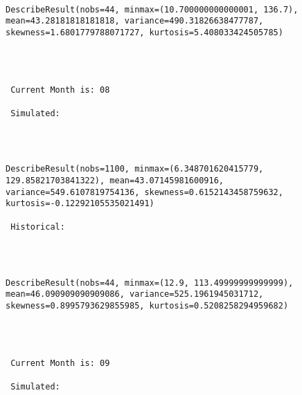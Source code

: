 \documentclass[11pt]{article}
\begin{document}
    \begin{center}
    \end{center}
    { \hspace*{\fill} \\}
    
    \begin{Verbatim}[commandchars=\\\{\}]
DescribeResult(nobs=44, minmax=(10.700000000000001, 136.7), mean=43.28181818181818, variance=490.31826638477787, skewness=1.6801779788071727, kurtosis=5.408033424505785) 



 
 Current Month is: 08

 Simulated: 
 

    \end{Verbatim}

    \begin{center}
    \end{center}
    { \hspace*{\fill} \\}
    
    \begin{Verbatim}[commandchars=\\\{\}]
DescribeResult(nobs=1100, minmax=(6.348701620415779, 129.85821703841322), mean=43.07145981600916, variance=549.6107819754136, skewness=0.6152143458759632, kurtosis=-0.12292105535021491)

 Historical: 
 

    \end{Verbatim}

    \begin{center}
    \end{center}
    { \hspace*{\fill} \\}
    
    \begin{Verbatim}[commandchars=\\\{\}]
DescribeResult(nobs=44, minmax=(12.9, 113.49999999999999), mean=46.090909090909086, variance=525.1961945031712, skewness=0.8995793629855985, kurtosis=0.5208258294959682) 



 
 Current Month is: 09

 Simulated: 
 

    \end{Verbatim}
\end{document}
